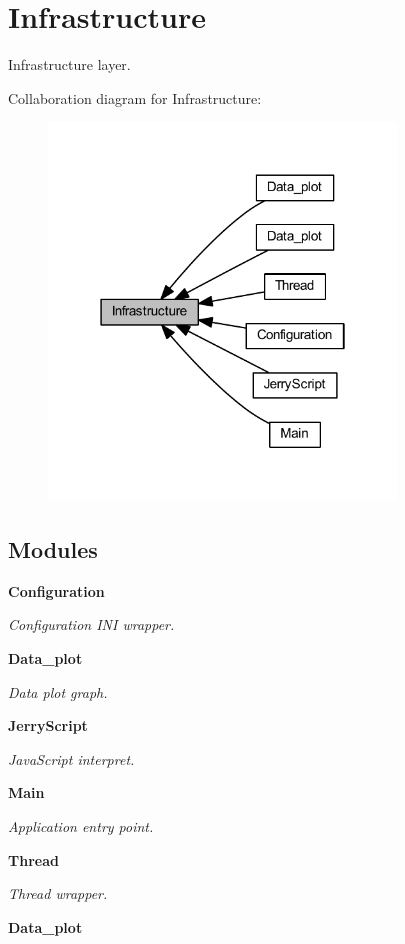 \section{Infrastructure}
\label{group___infrastructure}


Infrastructure layer.  


Collaboration diagram for Infrastructure\+:\nopagebreak
\begin{figure}[H]
\begin{center}
\leavevmode
\includegraphics[width=262pt]{group___infrastructure}
\end{center}
\end{figure}
\subsection*{Modules}
\begin{DoxyCompactItemize}
\item 
\textbf{ Configuration}
\begin{DoxyCompactList}\small\item\em Configuration I\+NI wrapper. \end{DoxyCompactList}\item 
\textbf{ Data\+\_\+plot}
\begin{DoxyCompactList}\small\item\em Data plot graph. \end{DoxyCompactList}\item 
\textbf{ Jerry\+Script}
\begin{DoxyCompactList}\small\item\em Java\+Script interpret. \end{DoxyCompactList}\item 
\textbf{ Main}
\begin{DoxyCompactList}\small\item\em Application entry point. \end{DoxyCompactList}\item 
\textbf{ Thread}
\begin{DoxyCompactList}\small\item\em Thread wrapper. \end{DoxyCompactList}\item 
\textbf{ Data\+\_\+plot}
\end{DoxyCompactItemize}
